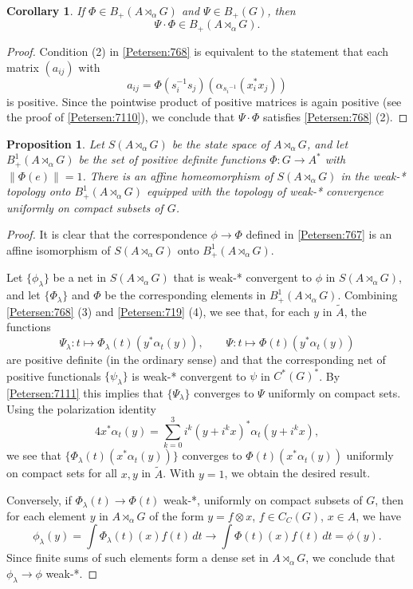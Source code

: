 \documentclass{book}
\newtheorem{proposition}[definition]{Proposition}
\newtheorem{corollary}[definition]{Corollary}
\begin{document}
\begin{corollary}\label{Petersen:769}
  If \(\Phi\in B_+(A\rtimes_\alpha G)\) and \(\Psi\in B_+(G)\), then 
  \[
    \Psi\cdot\Phi\in B_+(A\rtimes_\alpha G).
  \]
\end{corollary}
\begin{proof}
  Condition (2) in \ref{Petersen:768} is equivalent to the statement that each matrix \((a_{ij})\) with
  \[
    a_{ij}=\Phi(s_i^{-1}s_j)(\alpha_{{s_i}^{-1}}(x_i^* x_j))
  \]
  is positive. Since the pointwise product of positive matrices is again positive (see the proof of \ref{Petersen:7110}), we conclude that
  \(\Psi\cdot\Phi\) satisfies \ref{Petersen:768} (2).
\end{proof}

\begin{proposition}\label{Petersen:7610}
  Let \(S(A\rtimes_\alpha G)\) be the state space of \(A\rtimes_\alpha G\), and let \(B_+^1(A\rtimes_\alpha G)\)
  be the set of positive definite functions \(\Phi:G\rightarrow A^*\) with \(\|\Phi(e)\|=1\).
  There is an affine homeomorphism of \(S(A\rtimes_\alpha G)\) in the weak-* topology onto
  \(B_+^1(A\rtimes_\alpha G)\) equipped with the topology of weak-* convergence uniformly on compact subsets of \(G\).
\end{proposition}
\begin{proof}
  It is clear that the correspondence \(\phi\rightarrow\Phi\) defined in \ref{Petersen:767} is an affine isomorphism 
  of \(S(A\rtimes_\alpha G)\) onto \(B_+^1(A\rtimes_\alpha G)\).\par
  Let \(\{\phi_\lambda\}\) be a net in \(S(A\rtimes_\alpha G)\) that is weak-* convergent to \(\phi\) in \(S(A\rtimes_\alpha G)\),
  and let \(\{\Phi_\lambda\}\) and \(\Phi\) be the corresponding elements in \(B_+^1(A\rtimes_\alpha G)\). Combining \ref{Petersen:768} (3) and \ref{Petersen:719} (4),
  we see that, for each \(y\) in \(\tilde{A}\), the functions
  \[
    \Psi_\lambda:t\mapsto\Phi_\lambda(t)(y^*\alpha_t(y)),\qquad\Psi:t\mapsto\Phi(t)(y^* \alpha_t(y))
  \]
  are positive definite (in the ordinary sense) and that the corresponding net of positive functionals
  \(\{\psi_\lambda\}\) is weak-* convergent to \(\psi\) in \(C^*(G)^*\).
  By \ref{Petersen:7111} this implies that \(\{\Psi_\lambda\}\) converges to \(\Psi\) uniformly on compact sets.
  Using the polarization identity
  \[
    4x^*\alpha_t(y)=\sum_{k=0}^3 i^k(y+i^k x)^*\alpha_t(y+i^k x),
  \]  
  we see that \(\{\Phi_\lambda(t)(x^*\alpha_t(y))\}\) converges to \(\Phi(t)(x^*\alpha_t(y))\) uniformly on compact sets for all
  \(x,y\) in \(\tilde{A}\). With \(y=1\), we obtain the desired result.\par
  Conversely, if \(\Phi_\lambda(t)\rightarrow\Phi(t)\) weak-*, uniformly on compact subsets of \(G\),
  then for each element \(y\) in \(A\rtimes_\alpha G\) of the form \(y=f\otimes x\), \(f\in C_C(G)\), \(x\in A\), we have
  \[
    \phi_\lambda(y)=\int\Phi_\lambda(t)(x)f(t)\,dt\rightarrow\int\Phi(t)(x)f(t)\,dt=\phi(y).
  \]
  Since finite sums of such elements form a dense set in \(A\rtimes_\alpha G\), we conclude that \(\phi_\lambda\rightarrow \phi\) weak-*.
\end{proof}
\end{document}
